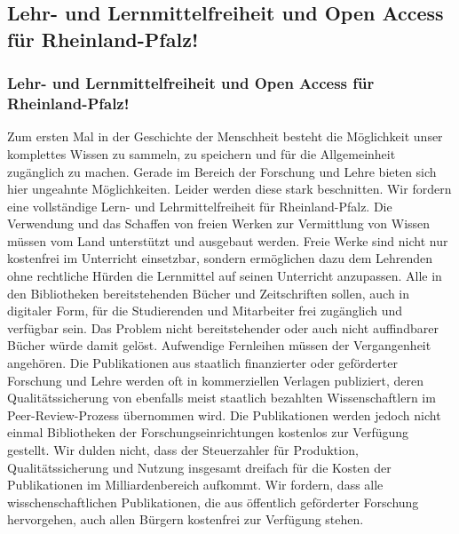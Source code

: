 \subsection*{Lehr- und Lernmittelfreiheit und Open Access für Rheinland-Pfalz!}
\label{wp:bildung:freiheit1}

\subsubsection{Lehr- und Lernmittelfreiheit und Open Access für Rheinland-Pfalz!}
\abstimmung
Zum ersten Mal in der Geschichte der Menschheit besteht die Möglichkeit unser komplettes Wissen zu sammeln, zu speichern und für die Allgemeinheit zugänglich zu machen. Gerade im Bereich der Forschung und Lehre bieten sich hier ungeahnte Möglichkeiten. Leider werden diese stark beschnitten. Wir fordern eine vollständige Lern- und Lehrmittelfreiheit für Rheinland-Pfalz. Die Verwendung und das Schaffen von freien Werken zur Vermittlung von Wissen müssen vom Land unterstützt und ausgebaut werden. Freie Werke sind nicht nur kostenfrei im Unterricht einsetzbar, sondern ermöglichen dazu dem Lehrenden ohne rechtliche Hürden die Lernmittel auf seinen Unterricht anzupassen. Alle in den Bibliotheken bereitstehenden Bücher und Zeitschriften sollen, auch in digitaler Form, für die Studierenden und Mitarbeiter frei zugänglich und verfügbar sein. Das Problem nicht bereitstehender oder auch nicht auffindbarer Bücher würde damit gelöst. Aufwendige Fernleihen müssen der Vergangenheit angehören. Die Publikationen aus staatlich finanzierter oder geförderter Forschung und Lehre werden oft in kommerziellen Verlagen publiziert, deren Qualitätssicherung von ebenfalls meist staatlich bezahlten Wissenschaftlern im Peer-Review-Prozess übernommen wird. Die Publikationen werden jedoch nicht einmal Bibliotheken der Forschungseinrichtungen kostenlos zur Verfügung gestellt. Wir dulden nicht, dass der Steuerzahler für Produktion, Qualitätssicherung und Nutzung insgesamt dreifach für die Kosten der Publikationen im Milliardenbereich aufkommt. Wir fordern, dass alle wisschenschaftlichen Publikationen, die aus öffentlich geförderter Forschung hervorgehen, auch allen Bürgern kostenfrei zur Verfügung stehen.

